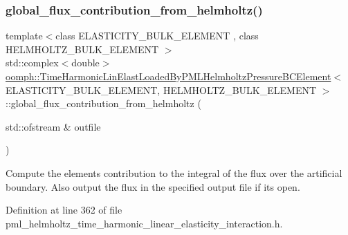 \mbox{\label{classoomph_1_1TimeHarmonicLinElastLoadedByPMLHelmholtzPressureBCElement_a9848b595cc22cd7fca0c862bdf59cc85}} 
\subsubsection{\texorpdfstring{global\+\_\+flux\+\_\+contribution\+\_\+from\+\_\+helmholtz()}{global\_flux\_contribution\_from\_helmholtz()}\hspace{0.1cm}{\footnotesize\ttfamily [2/2]}}
{\footnotesize\ttfamily template$<$class E\+L\+A\+S\+T\+I\+C\+I\+T\+Y\+\_\+\+B\+U\+L\+K\+\_\+\+E\+L\+E\+M\+E\+NT , class H\+E\+L\+M\+H\+O\+L\+T\+Z\+\_\+\+B\+U\+L\+K\+\_\+\+E\+L\+E\+M\+E\+NT $>$ \\
std\+::complex$<$double$>$ \hyperlink{classoomph_1_1TimeHarmonicLinElastLoadedByPMLHelmholtzPressureBCElement}{oomph\+::\+Time\+Harmonic\+Lin\+Elast\+Loaded\+By\+P\+M\+L\+Helmholtz\+Pressure\+B\+C\+Element}$<$ E\+L\+A\+S\+T\+I\+C\+I\+T\+Y\+\_\+\+B\+U\+L\+K\+\_\+\+E\+L\+E\+M\+E\+NT, H\+E\+L\+M\+H\+O\+L\+T\+Z\+\_\+\+B\+U\+L\+K\+\_\+\+E\+L\+E\+M\+E\+NT $>$\+::global\+\_\+flux\+\_\+contribution\+\_\+from\+\_\+helmholtz (\begin{DoxyParamCaption}\item[{std\+::ofstream \&}]{outfile }\end{DoxyParamCaption})\hspace{0.3cm}{\ttfamily [inline]}}



Compute the element\textquotesingle{}s contribution to the integral of the flux over the artificial boundary. Also output the flux in the specified output file if it\textquotesingle{}s open. 



Definition at line 362 of file pml\+\_\+helmholtz\+\_\+time\+\_\+harmonic\+\_\+linear\+\_\+elasticity\+\_\+interaction.\+h.



